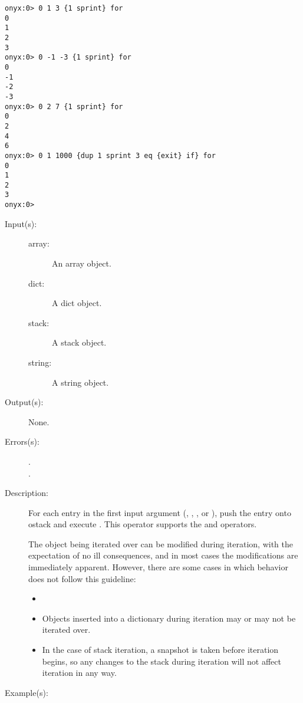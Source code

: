 \begin{description}
\begin{description}
\begin{verbatim}
onyx:0> 0 1 3 {1 sprint} for
0
1
2
3
onyx:0> 0 -1 -3 {1 sprint} for
0
-1
-2
-3
onyx:0> 0 2 7 {1 sprint} for
0
2
4
6
onyx:0> 0 1 1000 {dup 1 sprint 3 eq {exit} if} for
0
1
2
3
onyx:0>
		\end{verbatim}
	\end{description}
\label{systemdict:foreach}
\item[{\onyxop{array proc}{foreach}{--}}: ]
\item[{\onyxop{dict proc}{foreach}{--}}: ]
\item[{\onyxop{stack proc}{foreach}{--}}: ]
\item[{\onyxop{string proc}{foreach}{--}}: ]
	\begin{description}\item[]
	\item[Input(s): ]
		\begin{description}\item[]
		\item[array: ]
			An array object.
		\item[dict: ]
			A dict object.
		\item[stack: ]
			A stack object.
		\item[string: ]
			A string object.
		\end{description}
	\item[Output(s): ] None.
	\item[Errors(s): ]
		\begin{description}\item[]
		\item[.]
		\item[.]
		\end{description}
	\item[Description: ]
		For each entry in the first input argument (,
		, , or ), push the entry
		onto ostack and execute .  This operator supports
		the  and
		 operators.

		The object being iterated over can be modified during iteration,
		with the expectation of no ill consequences, and in most cases
		the modifications are immediately apparent.  However, there are
		some cases in which behavior does not follow this guideline:
		\begin{itemize}\item[]
		\item{Objects inserted into a dictionary during iteration may or
			may not be iterated over.}
		\item{In the case of stack iteration, a snapshot is taken before
			iteration begins, so any changes to the stack during
			iteration will not affect iteration in any way.}
		\end{itemize}
	\item[Example(s): ]\begin{verbatim}


\end{verbatim}
\end{description}
\end{description}

